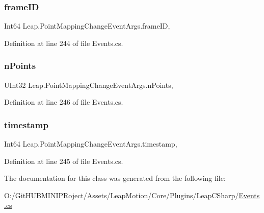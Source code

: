 \subsubsection{\texorpdfstring{frameID}{frameID}}
{\footnotesize\ttfamily Int64 Leap.\+Point\+Mapping\+Change\+Event\+Args.\+frame\+ID\hspace{0.3cm}{\ttfamily [get]}, {\ttfamily [set]}}



Definition at line 244 of file Events.\+cs.

\mbox{\label{class_leap_1_1_point_mapping_change_event_args_a8d2641c938fa1dacbc9719c5d51e17bb}} 
\subsubsection{\texorpdfstring{nPoints}{nPoints}}
{\footnotesize\ttfamily U\+Int32 Leap.\+Point\+Mapping\+Change\+Event\+Args.\+n\+Points\hspace{0.3cm}{\ttfamily [get]}, {\ttfamily [set]}}



Definition at line 246 of file Events.\+cs.

\mbox{\label{class_leap_1_1_point_mapping_change_event_args_ade4a64a8fea36bf357d6da923ca621b7}} 
\subsubsection{\texorpdfstring{timestamp}{timestamp}}
{\footnotesize\ttfamily Int64 Leap.\+Point\+Mapping\+Change\+Event\+Args.\+timestamp\hspace{0.3cm}{\ttfamily [get]}, {\ttfamily [set]}}



Definition at line 245 of file Events.\+cs.



The documentation for this class was generated from the following file\+:\begin{DoxyCompactItemize}
\item 
O\+:/\+Git\+H\+U\+B\+M\+I\+N\+I\+P\+Roject/\+Assets/\+Leap\+Motion/\+Core/\+Plugins/\+Leap\+C\+Sharp/\mbox{\hyperlink{_events_8cs}{Events.\+cs}}\end{DoxyCompactItemize}
